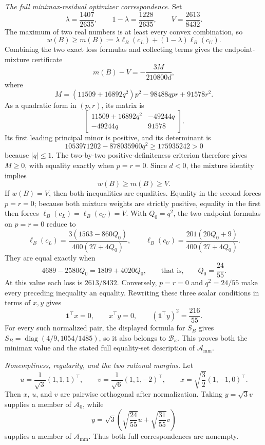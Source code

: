 \emph{The full minimax-residual optimizer correspondence.}
Set
\[
\lambda=\frac{1407}{2635},
\qquad
1-\lambda=\frac{1228}{2635},
\qquad
V=\frac{2613}{8432}.
\]
The maximum of two real numbers is at least every convex combination, so
\[
w(B)\ge
m(B):=\lambda\ell_B(c_L)+(1-\lambda)\ell_B(c_U).
\]
Combining the two exact loss formulas and collecting terms gives the endpoint-mixture certificate
\[
m(B)-V=-\frac{3M}{210800d},
\]
where
\[
M=(11509+16892q^2)p^2-98488qpr+91578r^2.
\]
As a quadratic form in \((p,r)\), its matrix is
\[
\begin{bmatrix}
11509+16892q^2&-49244q\\
-49244q&91578
\end{bmatrix}.
\]
Its first leading principal minor is positive, and its determinant is
\[
1053971202-878035960q^2
\ge175935242>0
\]
because \(|q|\le1\).  The two-by-two positive-definiteness criterion therefore gives \(M\ge0\), with equality exactly when \(p=r=0\).  Since \(d<0\), the mixture identity implies
\[
w(B)\ge m(B)\ge V.
\]
If \(w(B)=V\), then both inequalities are equalities.  Equality in the second forces \(p=r=0\); because both mixture weights are strictly positive, equality in the first then forces \(\ell_B(c_L)=\ell_B(c_U)=V\).  With \(Q_0=q^2\), the two endpoint formulas on \(p=r=0\) reduce to
\[
\ell_B(c_L)=\frac{3(1563-860Q_0)}{400(27+4Q_0)},
\qquad
\ell_B(c_U)=\frac{201(20Q_0+9)}{400(27+4Q_0)}.
\]
They are equal exactly when
\[
4689-2580Q_0=1809+4020Q_0,
\qquad\text{that is,}\qquad Q_0=\frac{24}{55}.
\]
At this value each loss is \(2613/8432\).  Conversely, \(p=r=0\) and \(q^2=24/55\) make every preceding inequality an equality.  Rewriting these three scalar conditions in terms of \(x,y\) gives
\[
\mathbf 1^{\top}x=0,
\qquad x^{\top}y=0,
\qquad(\mathbf 1^{\top}y)^2=\frac{216}{55}.
\]
For every such normalized pair, the displayed formula for \(S_B\) gives \(S_B=\operatorname{diag}(4/9,1054/1485)\), so it also belongs to \(\mathcal B_\kappa\).  This proves both the minimax value and the stated full equality-set description of \(\mathcal A_{\mathrm{mm}}\).

\emph{Nonemptiness, regularity, and the two rational margins.}
Let
\[
u=\frac1{\sqrt3}(1,1,1)^{\top},
\qquad
v=\frac1{\sqrt6}(1,1,-2)^{\top},
\qquad
x=\sqrt{\frac32}(1,-1,0)^{\top}.
\]
Then \(x\), \(u\), and \(v\) are pairwise orthogonal after normalization.  Taking \(y=\sqrt3v\) supplies a member of \(\mathcal A_0\), while
\[
y=\sqrt3\left(\sqrt{\frac{24}{55}}u+\sqrt{\frac{31}{55}}v\right)
\]
supplies a member of \(\mathcal A_{\mathrm{mm}}\).  Thus both full correspondences are nonempty.

